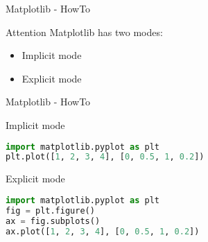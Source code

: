 \documentclass{beamer}
\begin{document}
\begin{frame}[fragile]{Matplotlib - HowTo}
    \begin{alertblock}{Attention}
        Matplotlib has two modes:
        
        \begin{itemize}
            \item<1-> Implicit mode
    
            \item<6-> Explicit mode
        \end{itemize}
        
    \end{alertblock}
\end{frame}


\begin{frame}[fragile]{Matplotlib - HowTo}
    \begin{exampleblock}{Implicit mode}
    \end{exampleblock}
    \begin{lstlisting}[language=Python, backgroundcolor = \color{lightgray}]
import matplotlib.pyplot as plt
plt.plot([1, 2, 3, 4], [0, 0.5, 1, 0.2])
    \end{lstlisting}
    \pause
    \begin{exampleblock}{Explicit mode}
    \end{exampleblock}
    \begin{lstlisting}[language=Python, backgroundcolor = \color{lightgray}]
import matplotlib.pyplot as plt
fig = plt.figure()
ax = fig.subplots()
ax.plot([1, 2, 3, 4], [0, 0.5, 1, 0.2])
    \end{lstlisting}
\end{frame}
\end{document}
